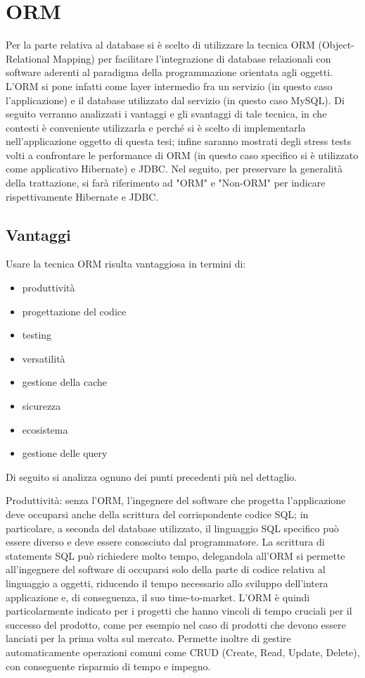 \chapter{ORM}

Per la parte relativa al database si è scelto di utilizzare la tecnica ORM (Object-Relational Mapping) per facilitare l'integrazione di database relazionali con software aderenti al paradigma della programmazione orientata agli oggetti. L'ORM si pone infatti come layer intermedio fra un servizio (in questo caso l'applicazione) e il database utilizzato dal servizio (in questo caso MySQL). Di seguito verranno analizzati i vantaggi e gli svantaggi di tale tecnica, in che contesti è conveniente utilizzarla e perché si è scelto di implementarla nell'applicazione oggetto di questa tesi; infine saranno mostrati degli stress tests volti a confrontare le performance di ORM (in questo caso specifico si è utilizzato come applicativo Hibernate) e JDBC. Nel seguito, per preservare la generalità della trattazione, si farà riferimento ad "ORM" e "Non-ORM" per indicare rispettivamente Hibernate e JDBC.

\section{Vantaggi}

Usare la tecnica ORM risulta vantaggiosa in termini di:

\begin{itemize}
  \item produttività
  \item progettazione del codice
  \item testing
  \item versatilità
  \item gestione della cache 
  \item sicurezza
  \item ecosistema
  \item gestione delle query
\end{itemize}

Di seguito si analizza ognuno dei punti precedenti più nel dettaglio.

Produttività: senza l'ORM, l'ingegnere del software che progetta l'applicazione deve occuparsi anche della scrittura del corrispondente codice SQL; in particolare, a seconda del database utilizzato, il linguaggio SQL specifico può essere diverso e deve essere conosciuto dal programmatore. La scrittura di statements SQL può richiedere molto tempo, delegandola all'ORM si permette all'ingegnere del software di occuparsi solo della parte di codice relativa al linguaggio a oggetti, riducendo il tempo necessario allo sviluppo dell'intera applicazione e, di conseguenza, il suo time-to-market. L'ORM è quindi particolarmente indicato per i progetti che hanno vincoli di tempo cruciali per il successo del prodotto, come per esempio nel caso di prodotti che devono essere lanciati per la prima volta sul mercato. Permette inoltre di gestire automaticamente operazioni comuni come CRUD (Create, Read, Update, Delete), con conseguente risparmio di tempo e impegno. 

